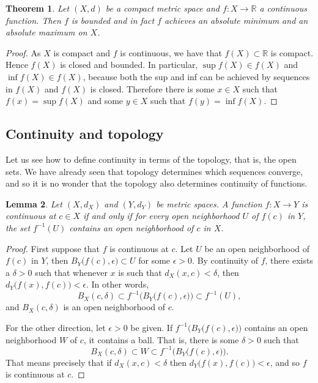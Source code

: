 \documentclass[12pt]{book}
\newcommand{\R}{{\mathbb{R}}}
\theoremstyle{plain}
\newtheorem{thm}{Theorem}[section]
\newtheorem{lemma}[thm]{Lemma}
\theoremstyle{remark}
\theoremstyle{definition}
\theoremstyle{exercise}
\theoremstyle{example}
\begin{document}
\begin{thm}
Let $(X,d)$ be a compact metric space
and $f \colon X \to \R$ a continuous function.  Then
$f$ is bounded and in fact
$f$ achieves an absolute minimum and an absolute maximum on $X$.
\end{thm}

\begin{proof}
As $X$ is compact and $f$ is continuous, we have
that $f(X) \subset \R$ is compact.  Hence $f(X)$ is closed
and bounded.  In particular,
$\sup f(X) \in f(X)$ and
$\inf f(X) \in f(X)$, because both the sup and inf
can be achieved by sequences in $f(X)$ and $f(X)$ is closed.
Therefore there is some $x \in X$ such that $f(x) = \sup f(X)$
and some $y \in X$ such that $f(y) = \inf f(X)$.
\end{proof}

\subsection{Continuity and topology}

Let us see how to define continuity in terms of the topology, that is,
the open sets.  We have already seen that topology determines which 
sequences converge, and so it is no wonder that the topology also
determines continuity of functions.

\begin{lemma} \label{lemma:mstopocontloc}
Let $(X,d_X)$ and $(Y,d_Y)$ be metric spaces.
A function $f \colon X \to Y$ is continuous at $c \in X$
if and only if for every open neighborhood $U$ of $f(c)$ in $Y$, the set
$f^{-1}(U)$ contains an open neighborhood of $c$ in $X$.
\end{lemma}

\begin{proof}
First suppose that $f$ is continuous at $c$.
Let $U$ be an open neighborhood of $f(c)$
in $Y$, then $B_Y\bigl(f(c),\epsilon\bigr) \subset U$ for some $\epsilon >
0$.  By continuity of $f$, there exists a $\delta > 0$
such that whenever $x$ is such that $d_X(x,c) < \delta$, then
$d_Y\bigl(f(x),f(c)\bigr) < \epsilon$.  In other words,
\begin{equation*}
B_X(c,\delta) \subset f^{-1}\bigl(B_Y\bigl(f(c),\epsilon\bigr)\bigr) \subset
f^{-1}(U) ,
\end{equation*}
and $B_X(c,\delta)$ is an open neighborhood of $c$.

For the other direction,
let $\epsilon > 0$ be given.  If
$f^{-1}\bigl(B_Y\bigl(f(c),\epsilon\bigr)\bigr)$ contains an open
neighborhood $W$ of $c$, it contains a ball.  That is, there is some $\delta > 0$
such that
\begin{equation*}
B_X(c,\delta) \subset W \subset f^{-1}\bigl(B_Y\bigl(f(c),\epsilon\bigr)\bigr) .
\end{equation*}
That means precisely that if $d_X(x,c) < \delta$ then $d_Y\bigl(f(x),f(c)\bigr)
< \epsilon$, and so $f$ is continuous at $c$.
\end{proof}
\end{document}
